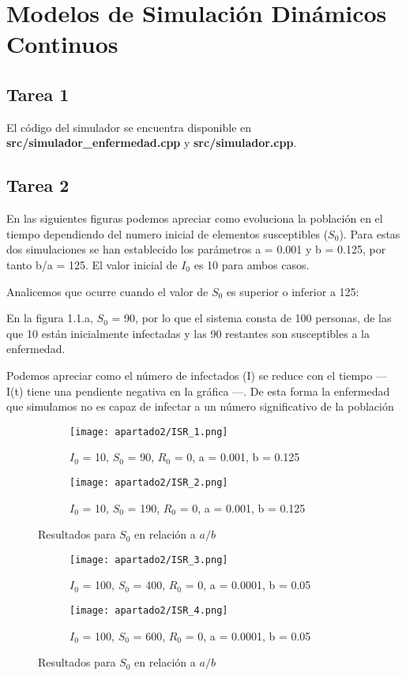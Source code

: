 \chapter{Modelos de Simulación Dinámicos Continuos}

\section{Tarea 1}

El código del simulador se encuentra disponible en \textbf{src/simulador\_enfermedad.cpp} y \textbf{src/simulador.cpp}.

\section{Tarea 2}

En las siguientes figuras podemos apreciar como evoluciona la población en el tiempo dependiendo del numero inicial de elementos susceptibles ($S_0$).
Para estas dos simulaciones se han establecido los parámetros a = 0.001 y b = 0.125, por tanto b/a = 125. El valor inicial de $I_0$ es 10 para ambos casos.

Analicemos que ocurre cuando el valor de $S_0$ es superior o inferior a 125:

En la figura 1.1.a, $S_0$ = 90, por lo que el sistema consta de 100 personas, de las que 10 están inicialmente infectadas y las 90 restantes son susceptibles a la enfermedad.

Podemos apreciar como el número de infectados (I) se reduce con el tiempo --- I(t) tiene una pendiente negativa en la gráfica ---. De esta forma la enfermedad que simulamos no es capaz de infectar a un número significativo de la población

\begin{figure}[H]
	\centering
	\begin{subfigure}[b]{0.8\textwidth}
		\centering
		\texttt{[image: apartado2/ISR\_1.png]}
		\caption{$I_0$ = 10, $S_0$ = 90, $R_0$ = 0, a = 0.001, b = 0.125}
	\end{subfigure}
	\hfill
	\begin{subfigure}[b]{0.8\textwidth}
		\centering
		\texttt{[image: apartado2/ISR\_2.png]}
		\caption{$I_0$ = 10, $S_0$ = 190, $R_0$ = 0, a = 0.001, b = 0.125}
	\end{subfigure}
	\caption{Resultados para $S_0$ en relación a $a/b$}
\end{figure}


\begin{figure}[H]
	\centering
	\begin{subfigure}[b]{0.8\textwidth}
		\centering
		\texttt{[image: apartado2/ISR\_3.png]}
		\caption{$I_0$ = 100, $S_0$ = 400, $R_0$ = 0, a = 0.0001, b = 0.05}
	\end{subfigure}
	\hfill
	\begin{subfigure}[b]{0.8\textwidth}
		\centering
		\texttt{[image: apartado2/ISR\_4.png]}
		\caption{$I_0$ = 100, $S_0$ = 600, $R_0$ = 0, a = 0.0001, b = 0.05}
	\end{subfigure}
	\caption{Resultados para $S_0$ en relación a $a/b$}
\end{figure}

